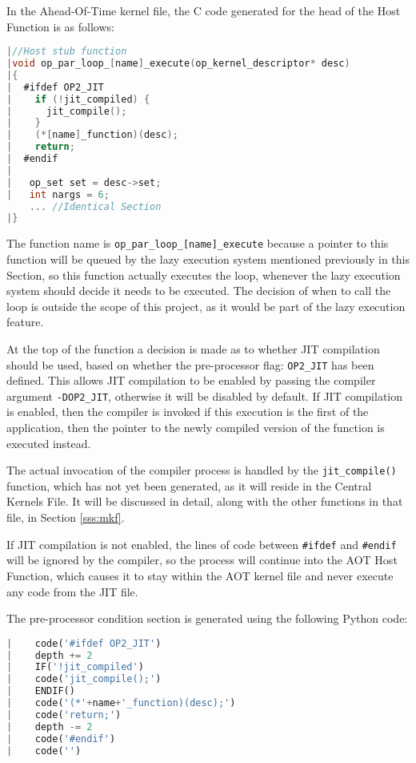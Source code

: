 In the Ahead-Of-Time kernel file, the C code generated for the head of the Host Function is as follows:

\begin{lstlisting}[linewidth = \textwidth, framesep=1pt, language=C, linebackgroundcolor={\ifnum\value{lstnumber}>10 \color{red!20} \else \color{blue!20} \fi}]
|//Host stub function
|void op_par_loop_[name]_execute(op_kernel_descriptor* desc)
|{
|  #ifdef OP2_JIT
|    if (!jit_compiled) {
|      jit_compile();
|    }
|    (*[name]_function)(desc);
|    return;
|  #endif
|
|   op_set set = desc->set;
|   int nargs = 6;
    ... //Identical Section
|}
\end{lstlisting}


\noindent The function name is \verb|op_par_loop_[name]_execute| because a pointer to this function will be queued by the lazy execution system mentioned previously in this Section, so this function actually executes the loop, whenever the lazy execution system should decide it needs to be executed. The decision of when to call the loop is outside the scope of this project, as it would be part of the lazy execution feature.
\par
\noindent At the top of the function a decision is made as to whether JIT compilation should be used, based on whether the pre-processor flag: \verb|OP2_JIT| has been defined. This allows JIT compilation to be enabled by passing the compiler argument \verb|-DOP2_JIT|, otherwise it will be disabled by default. If JIT compilation is enabled, then the compiler is invoked if this execution is the first of the application, then the pointer to the newly compiled version of the function is executed instead.
\par
The actual invocation of the compiler process is handled by the \verb|jit_compile()| function, which has not yet been generated, as it will reside in the Central Kernels File. It will be discussed in detail, along with the other functions in that file, in Section \ref{sss:mkf}.
\par
If JIT compilation is not enabled, the lines of code between \verb|#ifdef| and \verb|#endif| will be ignored by the compiler, so the process will continue into the AOT Host Function, which causes it to stay within the AOT kernel file and never execute any code from the JIT file.
\par
\noindent The pre-processor condition section is generated using the following Python code:
\begin{lstlisting}[backgroundcolor=\color{lightgray!20}, language=Python]
|    code('#ifdef OP2_JIT')
|    depth += 2
|    IF('!jit_compiled')
|    code('jit_compile();')
|    ENDIF()
|    code('(*'+name+'_function)(desc);')
|    code('return;')
|    depth -= 2
|    code('#endif')
|    code('')
\end{lstlisting}

